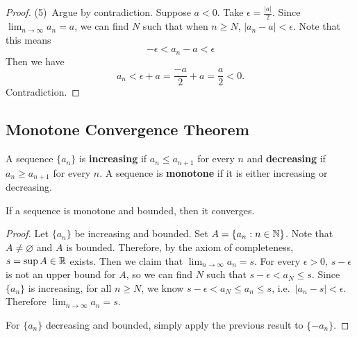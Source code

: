 \begin{proof}
  (5)\, Argue by contradiction. Suppose $a < 0$. Take
  $\epsilon = \frac{|a|}{2}$. Since
  $\lim_{n \to \infty} a_n = a$, we can find $N$ such
  that when $n \ge N$, $|a_n - a| < \epsilon$. Note that
  this means
  \[-\epsilon < a_n - a < \epsilon \]
  Then we have
  \[a_n < \epsilon + a = \frac{-a}{2} + a = \frac{a}{2} < 0.\]
  Contradiction.
\end{proof}

\subsection{Monotone Convergence Theorem}

\begin{definition}
  A sequence $\{a_n\}$ is \textbf{increasing} if
  $a_n \le a_{n + 1}$ for every $n$ and \textbf{decreasing}
  if $a_n \ge a_{n + 1}$ for every $n$. A sequence is
  \textbf{monotone} if it is either increasing or decreasing.
\end{definition}

\begin{theorem}
  If a sequence is monotone and bounded, then it converges.
\end{theorem}

\begin{proof}
  Let $\{a_n\}$ be increasing and bounded. Set
  $A = \{a_n : n \in \mathbb{N}\}$.
  Note that $A \ne \varnothing$ and $A$ is bounded. Therefore, by the
  axiom of completeness, $s = \sup A \in \mathbb{R}$ exists.
  Then we claim that $\lim_{n \to \infty} a_n = s$.
  For
  every $\epsilon > 0$, $s - \epsilon$ is not an upper bound
  for $A$, so we can find $N$ such that
  $s - \epsilon < a_{N} \le s$. 
  Since $\{a_n\}$ is increasing, for all $n \ge N$, we know
  $s - \epsilon < a_N \le a_n \le s$,
  i.e.~$|a_n - s| < \epsilon$. Therefore
  $\lim_{n \to \infty} a_n = s$.

  For $\{a_n\}$ decreasing and bounded, simply apply the
  previous result to $\{-a_n\}$.
\end{proof}
